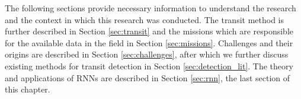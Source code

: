 
The following sections provide necessary information to understand the research and the context in which this research was conducted. The transit method is further described in Section \ref{sec:transit} and the missions which are responsible for the available data in the field in Section \ref{sec:missions}. Challenges and their origins are described in Section \ref{sec:challenges}, after which we further discuss existing methods for transit detection in Section \ref{sec:detection_lit}. The theory and applications of RNNs are described in Section \ref{sec:rnn}, the last section of this chapter.
